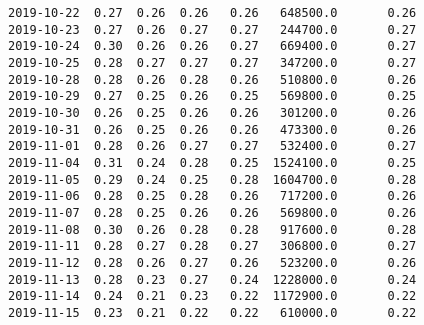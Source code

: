 \documentclass[11pt]{article}
\begin{document}
\begin{Verbatim}[commandchars=\\\{\}]
2019-10-22  0.27  0.26  0.26   0.26   648500.0       0.26
2019-10-23  0.27  0.26  0.27   0.27   244700.0       0.27
2019-10-24  0.30  0.26  0.26   0.27   669400.0       0.27
2019-10-25  0.28  0.27  0.27   0.27   347200.0       0.27
2019-10-28  0.28  0.26  0.28   0.26   510800.0       0.26
2019-10-29  0.27  0.25  0.26   0.25   569800.0       0.25
2019-10-30  0.26  0.25  0.26   0.26   301200.0       0.26
2019-10-31  0.26  0.25  0.26   0.26   473300.0       0.26
2019-11-01  0.28  0.26  0.27   0.27   532400.0       0.27
2019-11-04  0.31  0.24  0.28   0.25  1524100.0       0.25
2019-11-05  0.29  0.24  0.25   0.28  1604700.0       0.28
2019-11-06  0.28  0.25  0.28   0.26   717200.0       0.26
2019-11-07  0.28  0.25  0.26   0.26   569800.0       0.26
2019-11-08  0.30  0.26  0.28   0.28   917600.0       0.28
2019-11-11  0.28  0.27  0.28   0.27   306800.0       0.27
2019-11-12  0.28  0.26  0.27   0.26   523200.0       0.26
2019-11-13  0.28  0.23  0.27   0.24  1228000.0       0.24
2019-11-14  0.24  0.21  0.23   0.22  1172900.0       0.22
2019-11-15  0.23  0.21  0.22   0.22   610000.0       0.22


\end{Verbatim}
\end{document}
